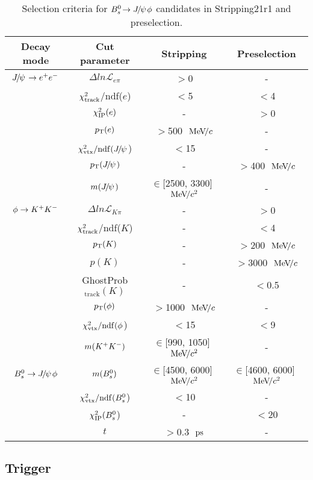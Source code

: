   \begin{table}[hbt]
  \caption{
    Selection criteria for $\BsToJPsiPhi$ candidates in Stripping21{r1} and preselection. 
}
    \small{
\begin{center} \begin{tabular}{|c|c|c|c|}
    \hline
 Decay mode & Cut parameter & Stripping & Preselection  \\
  \hline
 $\jpsi\to\epem$ & $\Delta ln\mathcal{L}_{e\pi}$ & $>$0 & - \\
 & $\chisq_{\text{track}}$/ndf($e$) & $<$5 & $<$4 \\
 & $\chisqip(e)$ & - & $>$0 \\
 & $\pt(e)$ & $>$500~$\mevc$ & - \\
 & $\chisqvtxndf(\jpsi$) & $<$15 & - \\
 & $\pt(\jpsi)$ & - & $>$400~$\mevc$ \\
 & $m(\jpsi)$ & $\in$[2500, 3300]~$\mevcc$ & - \\
 \hline
  $\phi\to\Kp\Km$ & $\Delta ln\mathcal{L}_{K\pi}$ & - & $>$0 \\
  & $\chisq_{\text{track}}$/ndf($K$) & - & $<$4 \\
  & $\pt(K)$ & - & $>$200~$\mevc$ \\
  & $p(K)$ & - & $>$3000~$\mevc$ \\
  & GhostProb$_{\text{track}}(K)$ & - & $<$0.5 \\
 & $\pt(\phi)$ & $>$1000~$\mevc$ & - \\
 & $\chisqvtxndf(\phi$) & $<$15 & $<$9 \\
 & $m(\Kp\Km)$ & $\in$[990, 1050]~$\mevcc$ & - \\
 \hline
  $\Bs\to\jpsi\phi$ & $m(\Bs)$ & $\in$[4500, 6000]~$\mevcc$ & $\in$[4600, 6000]~$\mevcc$ \\
 & $\chisqvtxndf(\Bs$) & $<$10 & - \\
 & $\chisqip(\Bs$) & - & $<$20 \\
 & $t$ & $>$0.3~$\ps$ & - \\
 \hline
    \end{tabular}\end{center}
  }
\label{tab:Selection}
\end{table}

\subsection{Trigger}\label{subsec:Trigger}

